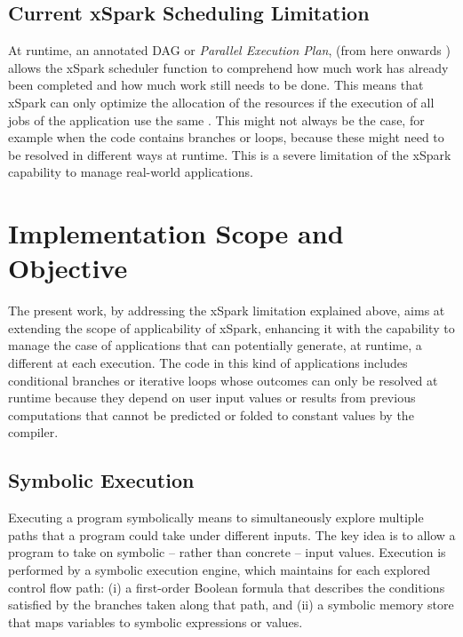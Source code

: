 \subsection{Current xSpark Scheduling Limitation}\label{sec:impl_xspark_sched_limitation}
At runtime, an annotated DAG or \textit{Parallel Execution Plan}, (from here onwards \plan) allows the xSpark scheduler function to comprehend how much work has already been completed and how much work still needs to be done. This means that xSpark can only optimize the allocation of the resources if the execution of all jobs of the application use the same \plan. This might not always be the case, for example when the code contains branches or loops, because these might need to be resolved in different ways at runtime. This is a severe limitation of the xSpark capability to manage real-world applications.

\section{Implementation Scope and Objective}\label{sec:impl_scope_objective}
The present work, by addressing the xSpark limitation explained above, aims at extending the scope of applicability of xSpark, enhancing it with the capability to manage the case of applications that can potentially generate, at runtime, a different \plan at each execution. The code in this kind of applications includes conditional branches or iterative loops whose outcomes can only be resolved at runtime because they depend on user input values or results from previous computations that cannot be predicted or folded to constant values by the compiler. 
\subsection{Symbolic Execution}\label{sec:impl_symbolic_execution}
Executing a program symbolically means to simultaneously explore multiple paths that a program could take under different inputs. The key idea is to allow a program to take on symbolic – rather than concrete – input values. Execution is performed by a symbolic execution engine, which maintains for each explored control flow path: 
(i)	a first-order Boolean formula that describes the conditions satisfied by the branches taken along that path, and (ii) a symbolic memory store that maps variables to symbolic expressions or values. 

